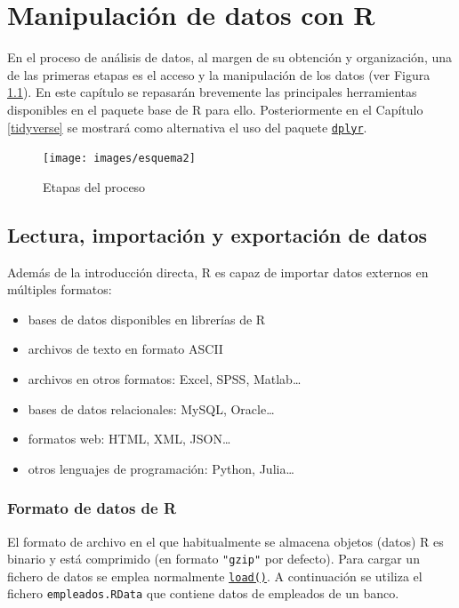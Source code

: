 \documentclass[
]{book}
\begin{document}
\chapter{Manipulación de datos con R}\label{manipR}

En el proceso de análisis de datos, al margen de su obtención y organización, una de las primeras etapas es el acceso y la manipulación de los datos (ver Figura \ref{fig:esquema2}).
En este capítulo se repasarán brevemente las principales herramientas disponibles en el paquete base de R para ello.
Posteriormente en el Capítulo \ref{tidyverse} se mostrará como alternativa el uso del paquete \href{https://dplyr.tidyverse.org/index.html}{\texttt{dplyr}}.

\begin{figure}[!htb]

{\centering \texttt{[image: images/esquema2]} 

}

\caption{Etapas del proceso}\label{fig:esquema2}
\end{figure}

\section{Lectura, importación y exportación de datos}\label{read}

Además de la introducción directa, R es capaz de
importar datos externos en múltiples formatos:

\begin{itemize}
\item
  bases de datos disponibles en librerías de R
\item
  archivos de texto en formato ASCII
\item
  archivos en otros formatos: Excel, SPSS, Matlab\ldots{}
\item
  bases de datos relacionales: MySQL, Oracle\ldots{}
\item
  formatos web: HTML, XML, JSON\ldots{}
\item
  otros lenguajes de programación: Python, Julia\ldots{}
\end{itemize}

\subsection{Formato de datos de R}\label{formato-de-datos-de-r}

El formato de archivo en el que habitualmente se almacena objetos (datos)
R es binario y está comprimido (en formato \texttt{"gzip"} por defecto).
Para cargar un fichero de datos se emplea normalmente \href{https://www.rdocumentation.org/packages/base/versions/3.6.1/topics/load}{\texttt{load()}}.
A continuación se utiliza el fichero \texttt{empleados.RData} que contiene datos de empleados de un banco.
\end{document}
